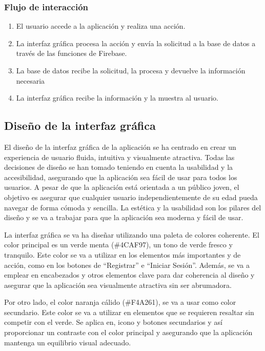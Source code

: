 \subsubsection{Flujo de interacción}

\begin{enumerate}
    \item El usuario accede a la aplicación y realiza una acción.
    \item La interfaz gráfica procesa la acción y envía la solicitud a la base de datos a través de las funciones de Firebase.
    \item La base de datos recibe la solicitud, la procesa y devuelve la información necesaria
    \item La interfaz gráfica recibe la información y la muestra al usuario.
\end{enumerate}


\subsection{Diseño de la interfaz gráfica}
\label{sec:interfaz}
El diseño de la interfaz gráfica de la aplicación se ha centrado en crear un experiencia de usuario fluida, intuitiva y visualmente atractiva.
Todas las decisiones de diseño se han tomado teniendo en cuenta la usabilidad y la accesibilidad, asegurando que la aplicación sea fácil de usar para todos los usuarios.
A pesar de que la aplicación está orientada a un público joven, el objetivo es asegurar que cualquier usuario independientemente de su edad pueda navegar
de forma cómoda y sencilla. La estética y la usabilidad son los pilares del diseño y se va a trabajar para que la aplicación sea moderna y 
fácil de usar.

La interfaz gráfica se va ha diseñar utilizando una paleta de colores coherente. El color principal es un verde menta (\#4CAF97), un tono 
de verde fresco y tranquilo. Este color se va a utilizar en los elementos más importantes y de acción, como en los botones de 
``Registrar'' e ``Iniciar Sesión''. Además, se va a emplear en encabezados y otros elementos clave para dar coherencia al diseño y asegurar
que la aplicación sea visualmente atractiva sin ser abrumadora.

Por otro lado, el color naranja cálido (\#F4A261), se va a usar como color secundario. Este color se va a utilizar en elementos 
que se requieren resaltar sin competir con el verde. Se aplica en, icono y botones secundarios y así proporcionar un contraste 
con el color principal y asegurando que la aplicación mantenga un equilibrio visual adecuado.

